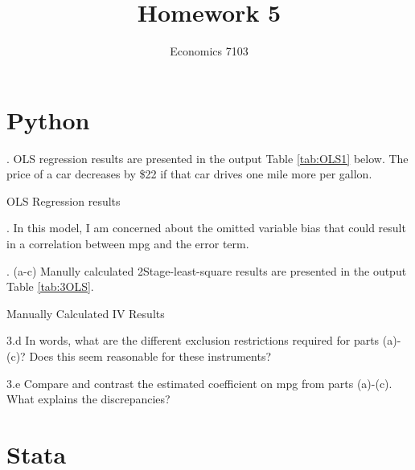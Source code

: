 \documentclass{article}
\title{Homework 5}
\author{Economics 7103}
\begin{document}
  
\maketitle

\section{Python}
. OLS regression results are presented in the output Table \ref{tab:OLS1} below. The price of a car decreases by \$22 if that car drives one mile more per gallon. 

\begin{table}[h]
    \centering
    
    \caption{OLS Regression results}
    \label{tab:OLS1}
\end{table}

. In this model, I am concerned about the omitted variable bias that could result in a correlation between mpg and the error term.

\clearpage

. (a-c) Manully calculated 2Stage-least-square results are presented in the output Table \ref{tab:3OLS}. 

\begin{table}[h]
    \centering
    
    \caption{Manually Calculated IV Results}
    \label{tab:3OLS}
\end{table}

\noindent 3.d In words, what are the different exclusion restrictions required for parts (a)-(c)? Does this seem reasonable for these instruments?


\noindent 3.e Compare and contrast the estimated coefficient on mpg from parts (a)-(c). What explains the discrepancies?


\section{Stata}
\end{document}
